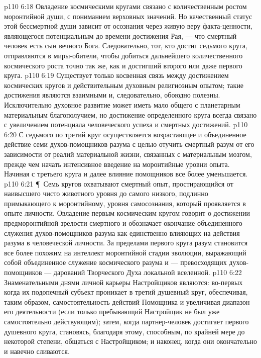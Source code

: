 \vs p110 6:18 Овладение космическими кругами связано с количественным ростом моронтийной души, с пониманием верховных значений. Но качественный статус этой бессмертной души  зависит от осознания через живую веру факта\hyp{}ценности, являющегося потенциальным до времени достижения Рая, --- что смертный человек есть сын вечного Бога. Следовательно, тот, кто достиг седьмого круга, отправляются в миры\hyp{}обители, чтобы добиться дальнейшего количественного космического роста точно так же, как и достигший второго или даже первого круга.
\vs p110 6:19 Существует только косвенная связь между достижением космических кругов и действительным духовным религиозным опытом; такие достижения являются взаимными и, следовательно, обоюдно полезны. Исключительно духовное развитие может иметь мало общего с планетарным материальным благополучием, но достижение определенного круга всегда связано с увеличением потенциала человеческого успеха и смертных достижений.
\vs p110 6:20 С седьмого по третий круг осуществляется возрастающее и объединенное действие семи духов\hyp{}помощников разума с целью отучить смертный разум от его зависимости от реалий материальной жизни, связанных с материальным мозгом, прежде чем начать интенсивное введение на моронтийные уровни опыта. Начиная с третьего круга и далее влияние помощников все более уменьшается.
\vs p110 6:21 \P\ Семь кругов охватывают смертный опыт, простирающийся от наивысшего чисто животного уровня до самого низкого, подлинно примыкающего к моронтийному, уровня самосознания, который проявляется в опыте личности. Овладение первым космическим кругом говорит о достижении предморонтийной зрелости смертного и обозначает окончание объединенного служения духов\hyp{}помощников разума как единственно влияющих на действия разума в человеческой личности. За пределами первого круга разум становится все более похожим на интеллект моронтийной стадии эволюции, выражающий собой объединенное служение космического разума и --- превосходящих духов\hyp{}помощников --- дарований Творческого Духа локальной вселенной.
\vs p110 6:22 Знаменательными днями личной карьеры Настройщиков являются: во\hyp{}первых когда их подопечный субъект проникает в третий душевный круг, обеспечивая, таким образом, самостоятельность действий Помощника и увеличивая диапазон его деятельности (если только пребывающий Настройщик не был уже самостоятельно действующим); затем, когда партнер\hyp{}человек достигает первого душевного круга, становясь, благодаря этому, способным, по крайней мере до некоторой степени, общаться с Настройщиком; и наконец, когда они окончательно и навечно сливаются.
